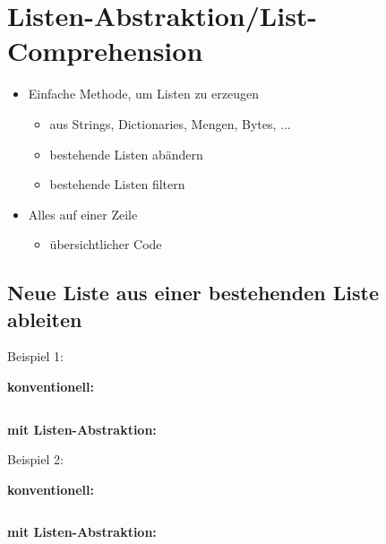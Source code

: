 
\section{Listen-Abstraktion/List-Comprehension}
\begin{itemize}
	\item Einfache Methode, um Listen zu erzeugen
	\begin{itemize}
		\item aus Strings, Dictionaries, Mengen, Bytes, ...
		\item bestehende Listen abändern
		\item bestehende Listen filtern
	\end{itemize}
	\item Alles auf einer Zeile
	\begin{itemize}
		\item übersichtlicher Code
	\end{itemize}
\end{itemize}

\subsection{Neue Liste aus einer bestehenden Liste ableiten}

Beispiel 1:\\
\begin{minipage}[t]{0.49\textwidth}
	\textbf{konventionell:}
	
\end{minipage}
\begin{minipage}[t]{0.02\textwidth} $ \quad $\end{minipage}
\begin{minipage}[t]{0.49\textwidth}
	\textbf{mit Listen-Abstraktion:}
	
\end{minipage}

Beispiel 2:\\
\begin{minipage}[t]{0.49\textwidth}
	\textbf{konventionell:}
	
\end{minipage}
\begin{minipage}[t]{0.02\textwidth} $ \quad $\end{minipage}
\begin{minipage}[t]{0.49\textwidth}
	\textbf{mit Listen-Abstraktion:}
	
\end{minipage}

